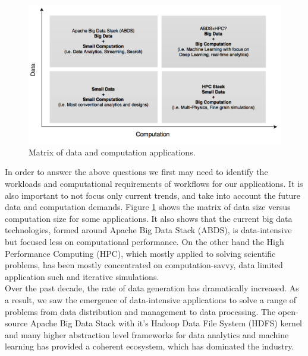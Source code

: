 \documentclass[runningheads,a4paper]{llncs}
\begin{document}
\begin{figure}
\includegraphics[scale=0.31]{./images/BigData_HPC.png}
\centering
\caption{Matrix of data and computation applications.}
\label{fig:bigdata_hpc_matrix}
\end{figure}
In order to answer the above questions we first may need to identify the workloads and computational requirements of workflows for our applications. It is also important to not focus only current trends, and take into account the future data and computation demands. Figure \ref{fig:bigdata_hpc_matrix} shows the matrix of data size versus computation size for some applications. It also shows that the current big data technologies, formed around Apache Big Data Stack (ABDS), is data-intensive but focused less on computational performance. On the other hand the High Performance Computing (HPC), which mostly applied to solving scientific problems, has been mostly concentrated on computation-savvy, data limited application such and iterative simulations.\\

Over the past decade, the rate of data generation has dramatically increased. As a result, we saw the emergence of data-intensive applications to solve a range of problems from data  distribution and management to data processing. The open-source Apache Big Data Stack with it's Hadoop Data File System (HDFS) kernel and many higher abstraction level frameworks for data analytics and machine learning has provided a coherent ecosystem, which has dominated the industry.\\
\end{document}

